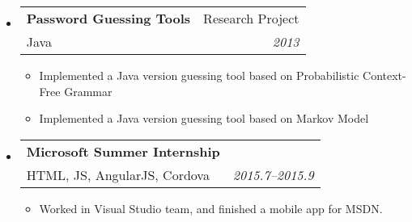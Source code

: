 \documentclass[letterpaper,10pt]{article}
\makeatletter
\newcommand{\resitem}[1]{\item #1 \vspace{-2pt}}
\newcommand{\ressubheading}[4]{
\begin{tabular*}{6.5in}{l@{\extracolsep{\fill}}r}
		\textbf{#1} & #2 \\
		#3 & #4 \\
\end{tabular*}\vspace{-6pt}}
\makeatother
\begin{document}
	\begin{itemize}
		\item
			\ressubheading{Password Guessing Tools}{Research Project}{Java}{\emph{2013}}
			{\begin{itemize}
				\resitem{Implemented a Java version guessing tool based on Probabilistic Context-Free Grammar}
                \resitem{Implemented a Java version guessing tool based on Markov Model}
			\end{itemize}
			}	
	\end{itemize}


	\begin{itemize}
		\item 
			\ressubheading{Microsoft Summer Internship}{}{HTML, JS, AngularJS, Cordova}{\emph{2015.7--2015.9}}
			{\begin{itemize}
				\resitem {Worked in Visual Studio team, and finished a mobile app for MSDN.}
			\end{itemize}}

	\end{itemize}


\end{document}
